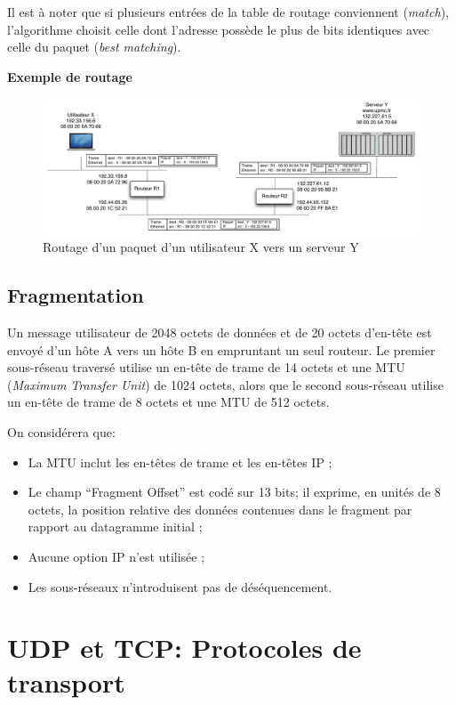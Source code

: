 \documentclass[11pt,english,french]{scrreprt}
\theoremstyle{remark}
\theoremstyle{definition}
\begin{document}
Il est à noter que si plusieurs entrées de la table de routage conviennent (\emph{match}), l'algorithme choisit celle dont l'adresse possède le plus de bits identiques avec celle du paquet (\emph{best matching}).

\textbf{Exemple de routage}
\begin{figure}[h!]
	\center
	\includegraphics[scale=.65]{graphes/IP/Routage}
	\caption{Routage d'un paquet d'un utilisateur X vers un serveur Y}
\end{figure}

\section{Fragmentation} %

Un message utilisateur de 2048 octets de données et de 20 octets d'en-tête est envoyé d'un hôte A vers un hôte B en empruntant un seul routeur. Le premier sous-réseau traversé utilise un en-tête de trame de 14 octets et une MTU (\emph{Maximum Transfer Unit}) de 1024 octets, alors que le second sous-réseau utilise un en-tête de trame de 8 octets et une MTU de 512 octets.

On considérera que:
\begin{itemize}
	\item La MTU inclut les en-têtes de trame et les en-têtes IP ;
	\item Le champ “Fragment Offset” est codé sur 13 bits; il exprime, en unités de 8 octets, la position relative des données contenues dans le fragment par rapport au datagramme initial ;
	\item Aucune option IP n'est utilisée ;
	\item Les sous-réseaux n'introduisent pas de déséquencement.
\end{itemize}

\chapter{UDP et TCP: Protocoles de transport} %
\end{document}

